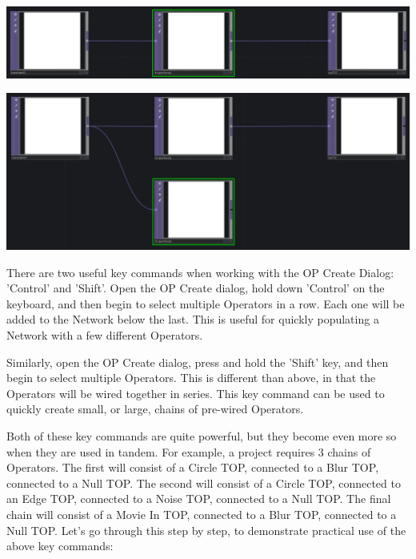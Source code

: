 \begin{fullwidth}
\begin{center}
\center \includegraphics{./img/1.2/creating-operators-2.png}

\center \includegraphics{./img/1.2/creating-operators-3.png}
\end{center}

There are two useful key commands when working with the OP Create Dialog: 'Control' and 'Shift'. Open the OP Create dialog, hold down 'Control' on the keyboard, and then begin to select multiple Operators in a row. Each one will be added to the Network below the last. This is useful for quickly populating a Network with a few different Operators. 

Similarly, open the OP Create dialog, press and hold the 'Shift' key, and then begin to select multiple Operators. This is different than above, in that the Operators will be wired together in series. This key command can be used to quickly create small, or large, chains of pre-wired Operators. 

Both of these key commands are quite powerful, but they become even more so when they are used in tandem. For example, a project requires 3 chains of Operators. The first will consist of a Circle TOP, connected to a Blur TOP, connected to a Null TOP. The second will consist of a Circle TOP, connected to an Edge TOP, connected to a Noise TOP, connected to a Null TOP. The final chain will consist of a Movie In TOP, connected to a Blur TOP, connected to a Null TOP. Let's go through this step by step, to demonstrate practical use of the above key commands:


\end{fullwidth}
